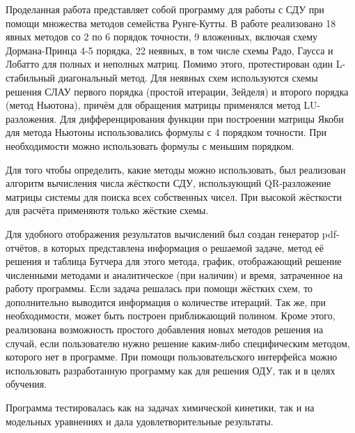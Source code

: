 \conclusion


Проделанная работа представляет собой программу для работы с СДУ при помощи множества методов семейства Рунге-Кутты. В работе
реализовано 18 явных методов со 2 по 6 порядок точности, 9 вложенных, включая схему Дормана-Принца 4-5 порядка, 22 неявных, в том числе
схемы Радо, Гаусса и Лобатто для полных и неполных матриц. Помимо этого, протестирован один L-стабильный диагональный метод. Для
неявных схем используются схемы решения СЛАУ первого порядка (простой итерации, Зейделя) и второго порядка (метод Ньютона), причём
для обращения
матрицы применялся метод LU-разложения. Для дифференцирования функции при построении матрицы Якоби для метода Ньютоны использовались
формулы с 4 порядком точности. При необходимости можно использовать формулы с меньшим порядком.

Для того чтобы определить, какие методы можно использовать, был реализован алгоритм вычисления числа жёсткости СДУ, использующий
QR-разложение матрицы системы для поиска всех собственных чисел. При высокой жёсткости для расчёта применяютя только жёсткие
схемы.

Для удобного отображения результатов вычислений был создан генератор pdf-отчётов, в которых представлена информация о решаемой задаче,
метод её решения и таблица Бутчера для этого метода, график, отображающий решение численными методами и аналитическое (при наличии) и
время, затраченное на работу программы. Если задача решалась при помощи жёстких схем, то дополнительно выводится информация о
количестве итераций. Так же, при необходимости, может быть построен приближающий полином. Кроме этого, реализована возможность простого
добавления новых методов решения на случай, если пользователю нужно решение каким-либо специфическим методом, которого нет в программе.
При помощи пользовательского интерфейса можно использовать разработанную программу как для решения ОДУ, так и в целях обучения.

Программа тестировалась как на задачах химической кинетики, так и на модельных уравнениях и дала удовлетворительные результаты.